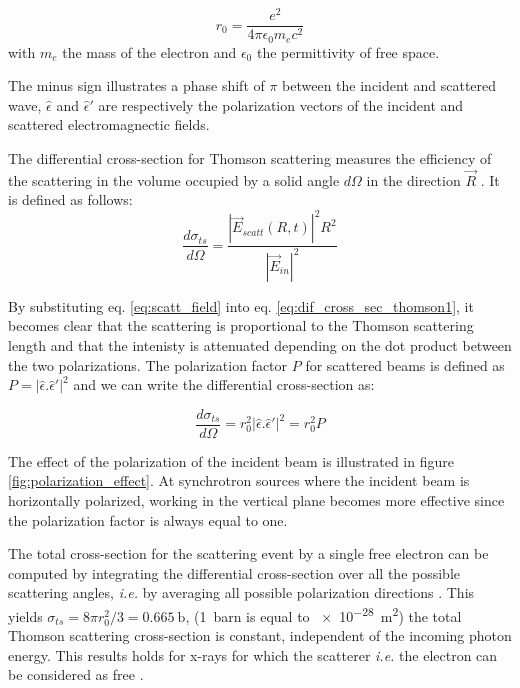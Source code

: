 \begin{equation}
    \label{eq:scatt_thomson_scat_length}
    r_0 = \frac{e^2} {4\pi\epsilon_0 m_e c^2}
\end{equation}
with $m_e$ the mass of the electron and $\epsilon_0$ the permittivity of free space.

The minus sign illustrates a phase shift of $\pi$ between the incident and scattered wave, $\hat{\epsilon}$ and $\hat{\epsilon}'$ are respectively the polarization vectors of the incident and scattered electromagnectic fields.

The differential cross-section for Thomson scattering measures the efficiency of the scattering in the volume occupied by a solid angle $d\Omega$ in the direction $\vec{R}$ \parencite{NielsenMcMorrow}. It is defined as follows:
\begin{equation}
    \label{eq:dif_cross_sec_thomson1}
    \frac{d\sigma_{ts}} {d \Omega} = \frac{ |\vec{E}_{scatt}(R, t)|^2 R^2} {|\vec{E}_{in}|^2}
\end{equation}

By substituting eq. \ref{eq:scatt_field} into eq. \ref{eq:dif_cross_sec_thomson1}, it becomes clear that the scattering is proportional to the Thomson scattering length and that the intenisty is attenuated depending on the dot product between the two polarizations.
The polarization factor $P$ for scattered beams is defined as $P =  | \hat{\epsilon}.\hat{\epsilon}'|^2$ and we can write the differential cross-section as:

\begin{equation}
    \frac{d\sigma_{ts}} {d \Omega} = r_0^2 | \hat{\epsilon}.\hat{\epsilon}'|^2 = r_0^2 P
\end{equation}

The effect of the polarization of the incident beam is illustrated in figure \ref{fig:polarization_effect}.
At synchrotron sources where the incident beam is horizontally polarized, working in the vertical plane becomes more effective since the polarization factor is always equal to one.

The total cross-section for the scattering event by a single free electron can be computed by integrating the differential cross-section over all the possible scattering angles, \textit{i.e.} by averaging all possible polarization directions \parencite{Willmott}.
This yields $\sigma_{ts} = 8 \pi r_0^2 /3 = \qty{0.665}{\barn}$, (\qty{1}{barn} is equal to \qty{e-28}{\m^2}) the total Thomson scattering cross-section is constant, independent of the incoming photon energy. This results holds for x-rays for which the scatterer \textit{i.e.} the electron can be considered as free \parencite{Willmott}.

